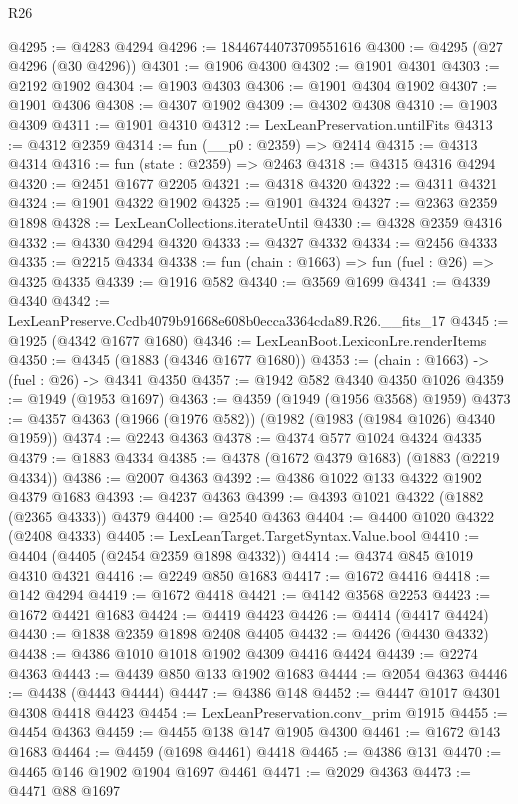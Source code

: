 \begin{lexlean}{R26}
\begin{coremodule}
@4295 := @4283 @4294
@4296 := 18446744073709551616
@4300 := @4295 (@27 @4296 (@30 @4296))
@4301 := @1906 @4300
@4302 := @1901 @4301
@4303 := @2192 @1902
@4304 := @1903 @4303
@4306 := @1901 @4304 @1902
@4307 := @1901 @4306
@4308 := @4307 @1902
@4309 := @4302 @4308
@4310 := @1903 @4309
@4311 := @1901 @4310
@4312 := LexLeanPreservation.untilFits
@4313 := @4312 @2359
@4314 := fun (__p0 : @2359) => @2414
@4315 := @4313 @4314
@4316 := fun (state : @2359) => @2463
@4318 := @4315 @4316 @4294
@4320 := @2451 @1677 @2205
@4321 := @4318 @4320
@4322 := @4311 @4321
@4324 := @1901 @4322 @1902
@4325 := @1901 @4324
@4327 := @2363 @2359 @1898
@4328 := LexLeanCollections.iterateUntil
@4330 := @4328 @2359 @4316
@4332 := @4330 @4294 @4320
@4333 := @4327 @4332
@4334 := @2456 @4333
@4335 := @2215 @4334
@4338 := fun (chain : @1663) => fun (fuel : @26) => @4325 @4335
@4339 := @1916 @582
@4340 := @3569 @1699
@4341 := @4339 @4340
@4342 := LexLeanPreserve.Ccdb4079b91668e608b0ecca3364cda89.R26.__fits_17
@4345 := @1925 (@4342 @1677 @1680)
@4346 := LexLeanBoot.LexiconLre.renderItems
@4350 := @4345 (@1883 (@4346 @1677 @1680))
@4353 := (chain : @1663) -> (fuel : @26) -> @4341 @4350
@4357 := @1942 @582 @4340 @4350 @1026
@4359 := @1949 (@1953 @1697)
@4363 := @4359 (@1949 (@1956 @3568) @1959)
@4373 := @4357 @4363 (@1966 (@1976 @582)) (@1982 (@1983 (@1984 @1026) @4340 @1959))
@4374 := @2243 @4363
@4378 := @4374 @577 @1024 @4324 @4335
@4379 := @1883 @4334
@4385 := @4378 (@1672 @4379 @1683) (@1883 (@2219 @4334))
@4386 := @2007 @4363
@4392 := @4386 @1022 @133 @4322 @1902 @4379 @1683
@4393 := @4237 @4363
@4399 := @4393 @1021 @4322 (@1882 (@2365 @4333)) @4379
@4400 := @2540 @4363
@4404 := @4400 @1020 @4322 (@2408 @4333)
@4405 := LexLeanTarget.TargetSyntax.Value.bool
@4410 := @4404 (@4405 (@2454 @2359 @1898 @4332))
@4414 := @4374 @845 @1019 @4310 @4321
@4416 := @2249 @850 @1683
@4417 := @1672 @4416
@4418 := @142 @4294
@4419 := @1672 @4418
@4421 := @4142 @3568 @2253
@4423 := @1672 @4421 @1683
@4424 := @4419 @4423
@4426 := @4414 (@4417 @4424)
@4430 := @1838 @2359 @1898 @2408 @4405
@4432 := @4426 (@4430 @4332)
@4438 := @4386 @1010 @1018 @1902 @4309 @4416 @4424
@4439 := @2274 @4363
@4443 := @4439 @850 @133 @1902 @1683
@4444 := @2054 @4363
@4446 := @4438 (@4443 @4444)
@4447 := @4386 @148
@4452 := @4447 @1017 @4301 @4308 @4418 @4423
@4454 := LexLeanPreservation.conv_prim @1915
@4455 := @4454 @4363
@4459 := @4455 @138 @147 @1905 @4300
@4461 := @1672 @143 @1683
@4464 := @4459 (@1698 @4461) @4418
@4465 := @4386 @131
@4470 := @4465 @146 @1902 @1904 @1697 @4461
@4471 := @2029 @4363
@4473 := @4471 @88 @1697

\end{coremodule}
\end{lexlean}

